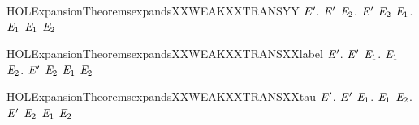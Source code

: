 \newcommand{\HOLExpansionTheoremsexpandsXXtransitive}{\UseVerbatim{HOLExpansionTheoremsexpandsXXtransitive}}
\begin{SaveVerbatim}{HOLExpansionTheoremsexpandsXXWEAKXXTRANSYY}
\HOLTokenTurnstile{} \HOLSymConst{\HOLTokenForall{}} \ensuremath{\HOLBoundVar{E}\sp{\prime}}.
         \ensuremath{\HOLBoundVar{E}\sp{\prime}} \HOLSymConst{\HOLTokenImp{}}
       \HOLSymConst{\HOLTokenForall{}} \ensuremath{\HOLBoundVar{E}\sb{\mathrm{2}}}. \ensuremath{\HOLBoundVar{E}\sp{\prime}} \HOLTokenWeakTransBegin{}\HOLTokenWeakTransEnd \ensuremath{\HOLBoundVar{E}\sb{\mathrm{2}}} \HOLSymConst{\HOLTokenImp{}} \HOLSymConst{\HOLTokenExists{}}\ensuremath{\HOLBoundVar{E}\sb{\mathrm{1}}}.  \HOLTokenWeakTransBegin{}\HOLTokenWeakTransEnd \ensuremath{\HOLBoundVar{E}\sb{\mathrm{1}}} \HOLSymConst{\HOLTokenConj{}} \ensuremath{\HOLBoundVar{E}\sb{\mathrm{1}}}  \ensuremath{\HOLBoundVar{E}\sb{\mathrm{2}}}
\end{SaveVerbatim}
\newcommand{\HOLExpansionTheoremsexpandsXXWEAKXXTRANSYY}{\UseVerbatim{HOLExpansionTheoremsexpandsXXWEAKXXTRANSYY}}
\begin{SaveVerbatim}{HOLExpansionTheoremsexpandsXXWEAKXXTRANSXXlabel}
\HOLTokenTurnstile{} \HOLSymConst{\HOLTokenForall{}} \ensuremath{\HOLBoundVar{E}\sp{\prime}}.
         \ensuremath{\HOLBoundVar{E}\sp{\prime}} \HOLSymConst{\HOLTokenImp{}}
       \HOLSymConst{\HOLTokenForall{}} \ensuremath{\HOLBoundVar{E}\sb{\mathrm{1}}}.
            \HOLTokenWeakTransBegin{} \HOLTokenWeakTransEnd \ensuremath{\HOLBoundVar{E}\sb{\mathrm{1}}} \HOLSymConst{\HOLTokenImp{}} \HOLSymConst{\HOLTokenExists{}}\ensuremath{\HOLBoundVar{E}\sb{\mathrm{2}}}. \ensuremath{\HOLBoundVar{E}\sp{\prime}} \HOLTokenWeakTransBegin{} \HOLTokenWeakTransEnd \ensuremath{\HOLBoundVar{E}\sb{\mathrm{2}}} \HOLSymConst{\HOLTokenConj{}} \ensuremath{\HOLBoundVar{E}\sb{\mathrm{1}}}  \ensuremath{\HOLBoundVar{E}\sb{\mathrm{2}}}
\end{SaveVerbatim}
\newcommand{\HOLExpansionTheoremsexpandsXXWEAKXXTRANSXXlabel}{\UseVerbatim{HOLExpansionTheoremsexpandsXXWEAKXXTRANSXXlabel}}
\begin{SaveVerbatim}{HOLExpansionTheoremsexpandsXXWEAKXXTRANSXXtau}
\HOLTokenTurnstile{} \HOLSymConst{\HOLTokenForall{}} \ensuremath{\HOLBoundVar{E}\sp{\prime}}.
         \ensuremath{\HOLBoundVar{E}\sp{\prime}} \HOLSymConst{\HOLTokenImp{}}
       \HOLSymConst{\HOLTokenForall{}}\ensuremath{\HOLBoundVar{E}\sb{\mathrm{1}}}.  \HOLTokenWeakTransBegin\HOLConst{\ensuremath{\tau}}\HOLTokenWeakTransEnd \ensuremath{\HOLBoundVar{E}\sb{\mathrm{1}}} \HOLSymConst{\HOLTokenImp{}} \HOLSymConst{\HOLTokenExists{}}\ensuremath{\HOLBoundVar{E}\sb{\mathrm{2}}}.  \ensuremath{\HOLBoundVar{E}\sp{\prime}} \ensuremath{\HOLBoundVar{E}\sb{\mathrm{2}}} \HOLSymConst{\HOLTokenConj{}} \ensuremath{\HOLBoundVar{E}\sb{\mathrm{1}}}  \ensuremath{\HOLBoundVar{E}\sb{\mathrm{2}}}
\end{SaveVerbatim}
